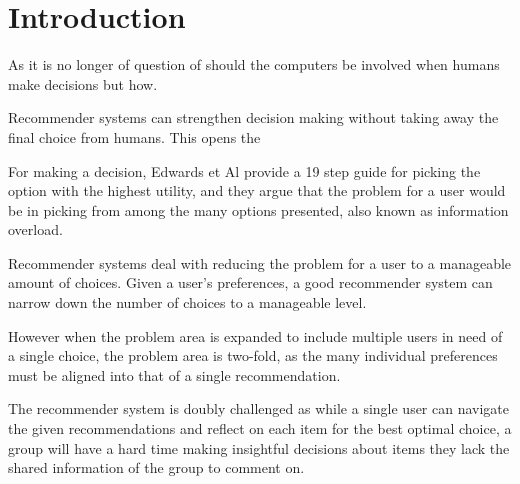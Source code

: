 \section{Introduction}
As it is no longer of question of should the computers be involved when humans make decisions but how.

Recommender systems can strengthen decision making without taking away the final choice from humans. This opens the 

For making a decision, Edwards et Al provide a 19 step guide for picking the option with the highest utility, and they argue that the problem for a user would be in picking from among the many options presented, also known as information overload\cite{Edwards2001}.

Recommender systems deal with reducing the problem for a user to a manageable amount of choices. Given a user's preferences, a good recommender system can narrow down the number of choices to a manageable level.

However when the problem area is expanded to include multiple users in need of a single choice, the problem area is two-fold, as the many individual preferences must be aligned into that of a single recommendation.

The recommender system is doubly challenged as while a single user can navigate the given recommendations and reflect on each item for the best optimal choice, a group will have a hard time making insightful decisions about items they lack the shared information of the group to comment on.
